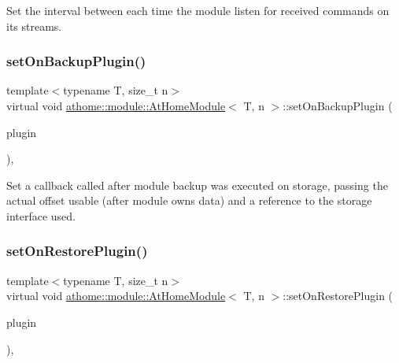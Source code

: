 Set the interval between each time the module listen for received commands on its streams. \mbox{\label{classathome_1_1module_1_1_at_home_module_aeb8a36ce4009ad6a578f41cd654877fa}} 
\subsubsection{\texorpdfstring{set\+On\+Backup\+Plugin()}{setOnBackupPlugin()}}
{\footnotesize\ttfamily template$<$typename T, size\+\_\+t n$>$ \\
virtual void \mbox{\hyperlink{classathome_1_1module_1_1_at_home_module}{athome\+::module\+::\+At\+Home\+Module}}$<$ T, n $>$\+::set\+On\+Backup\+Plugin (\begin{DoxyParamCaption}\item[{At\+Home\+Storage\+Plugin}]{plugin }\end{DoxyParamCaption})\hspace{0.3cm}{\ttfamily [inline]}, {\ttfamily [virtual]}}

Set a callback called after module backup was executed on storage, passing the actual offset usable (after module owns data) and a reference to the storage interface used. \mbox{\label{classathome_1_1module_1_1_at_home_module_a7ae30173c9c2871cd374d5d6786f43f6}} 
\subsubsection{\texorpdfstring{set\+On\+Restore\+Plugin()}{setOnRestorePlugin()}}
{\footnotesize\ttfamily template$<$typename T, size\+\_\+t n$>$ \\
virtual void \mbox{\hyperlink{classathome_1_1module_1_1_at_home_module}{athome\+::module\+::\+At\+Home\+Module}}$<$ T, n $>$\+::set\+On\+Restore\+Plugin (\begin{DoxyParamCaption}\item[{At\+Home\+Storage\+Plugin}]{plugin }\end{DoxyParamCaption})\hspace{0.3cm}{\ttfamily [inline]}, {\ttfamily [virtual]}}

